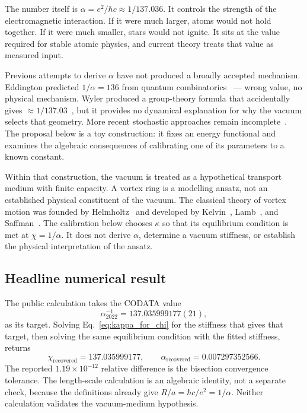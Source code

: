 \documentclass[11pt]{article}
\begin{document}
The number itself is $\alpha = e^2/\hbar c \approx 1/137.036$. It controls the
strength of the electromagnetic interaction. If it were much larger, atoms would
not hold together. If it were much smaller, stars would not ignite. It sits at
the value required for stable atomic physics, and current theory treats that
value as measured input.

Previous attempts to derive $\alpha$ have not produced a broadly accepted
mechanism. Eddington predicted
$1/\alpha = 136$ from quantum combinatorics~\cite{Eddington1929} --- wrong value,
no physical mechanism. Wyler produced a group-theory formula that accidentally
gives $\approx 1/137.03$~\cite{Wyler1969}, but it provides no dynamical explanation
for why the vacuum selects that geometry. More recent stochastic approaches remain
incomplete~\cite{BeckMackey2004}. The proposal below is a toy construction: it
fixes an energy functional and examines the algebraic consequences of
calibrating one of its parameters to a known constant.

Within that construction, the vacuum is treated as a hypothetical transport
medium with finite capacity. A vortex ring is a modelling ansatz, not an
established physical constituent of the vacuum. The classical theory of vortex
motion was founded by Helmholtz~\cite{Helmholtz1858} and developed by
Kelvin~\cite{Thomson1867}, Lamb~\cite{Lamb1932}, and Saffman~\cite{Saffman1992}.
The calibration below chooses $\kappa$ so that its equilibrium condition is met
at $\chi=1/\alpha$. It does not derive $\alpha$, determine a vacuum stiffness,
or establish the physical interpretation of the ansatz.

\subsection{Headline numerical result}

The public calculation takes the CODATA value
\[
  \alpha^{-1}_{2022}=137.035999177(21),
\]
as its target. Solving Eq.~\eqref{eq:kappa_for_chi} for the stiffness that gives
that target, then solving the same equilibrium condition with the fitted
stiffness, returns
\[
  \chi_\mathrm{recovered}=137.035999177,
  \qquad
  \alpha_\mathrm{recovered}=0.007297352566.
\]
The reported $1.19\times10^{-12}$ relative difference is the bisection
convergence tolerance. The length-scale calculation is an algebraic identity,
not a separate check, because the definitions already give
$R/a=\hbar c/e^2=1/\alpha$. Neither calculation validates the vacuum-medium
hypothesis.
\end{document}
